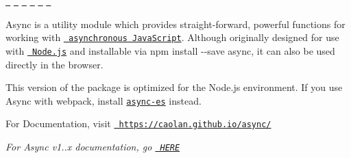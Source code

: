 

\href{https://travis-ci.org/caolan/async}{\texttt{ }} \href{https://www.npmjs.com/package/async}{\texttt{ }} \href{https://coveralls.io/r/caolan/async?branch=master}{\texttt{ }} \href{https://gitter.im/caolan/async?utm_source=badge&utm_medium=badge&utm_campaign=pr-badge&utm_content=badge}{\texttt{ }} \href{https://www.libhive.com/providers/npm/packages/async}{\texttt{ }} \href{https://www.jsdelivr.com/package/npm/async}{\texttt{ }}

Async is a utility module which provides straight-\/forward, powerful functions for working with \href{http://caolan.github.io/async/global.html}{\texttt{ asynchronous Java\+Script}}. Although originally designed for use with \href{https://nodejs.org/}{\texttt{ Node.\+js}} and installable via {\ttfamily npm install -\/-\/save async}, it can also be used directly in the browser.

This version of the package is optimized for the Node.\+js environment. If you use Async with webpack, install \href{https://www.npmjs.com/package/async-es}{\texttt{ {\ttfamily async-\/es}}} instead.

For Documentation, visit \href{https://caolan.github.io/async/}{\texttt{ https\+://caolan.\+github.\+io/async/}}

{\itshape For Async v1..\+x documentation, go \href{https://github.com/caolan/async/blob/v1.5.2/README.md}{\texttt{ HERE}}}


\begin{DoxyCode}{0}
\DoxyCodeLine{}
\DoxyCodeLine{}
\DoxyCodeLine{        \}}
\DoxyCodeLine{    \});}
\DoxyCodeLine{\});}

\end{DoxyCode}



\begin{DoxyCode}{0}
\DoxyCodeLine{}
\DoxyCodeLine{\})}

\end{DoxyCode}
 